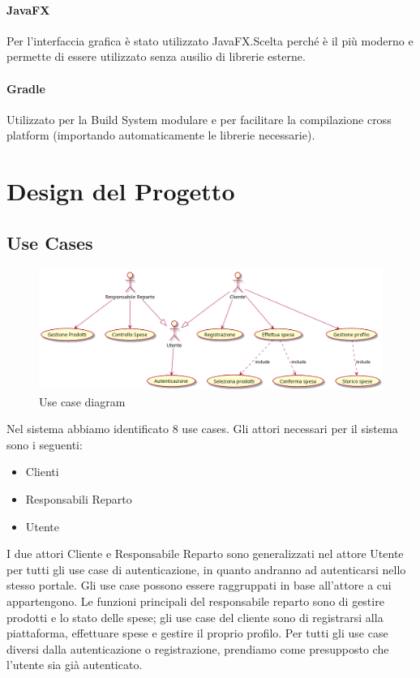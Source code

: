 \documentclass[12pt, a4paper]{report}
\begin{document}
\subsubsection{JavaFX}

Per l'interfaccia grafica è stato utilizzato JavaFX.\@ Scelta perché è il più 
moderno e permette di essere utilizzato senza ausilio di librerie esterne.

\subsubsection{Gradle}
Utilizzato per la Build System modulare e per facilitare la compilazione
cross platform (importando automaticamente le librerie necessarie).

\chapter{Design del Progetto}

\section{Use Cases}

\begin{figure}[h]
  \centering
  \includegraphics[width=\textwidth]{use_case_diagram.png}
  \caption{Use case diagram}
\end{figure}

Nel sistema abbiamo identificato 8 use cases. Gli attori necessari per il 
sistema sono i seguenti:

\begin{itemize}
  \item Clienti
  \item Responsabili Reparto
  \item Utente
\end{itemize}

I due attori Cliente e Responsabile Reparto sono generalizzati nel attore
Utente per tutti gli use case di autenticazione, in quanto andranno ad
autenticarsi nello stesso portale. Gli use case possono essere raggruppati in
base all'attore a cui appartengono. Le funzioni principali del responsabile
reparto sono di gestire prodotti e lo stato delle spese; gli use case del
cliente sono di registrarsi alla piattaforma, effettuare spese e gestire il
proprio profilo. Per tutti gli use case diversi dalla autenticazione o
registrazione, prendiamo come presupposto che l'utente sia già autenticato.
\end{document}
